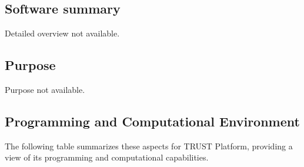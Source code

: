 \subsection{Software summary}
\label{sec:TRUST Platform:summary}
Detailed overview not available.



\subsection{Purpose}
\label{sec:TRUST Platform:purpose}
Purpose not available.

\subsection{Programming and Computational Environment}
\label{sec::TRUST Platform:environment_capabilities}


The following table summarizes these aspects for TRUST Platform, providing a  view of its programming and computational capabilities.

